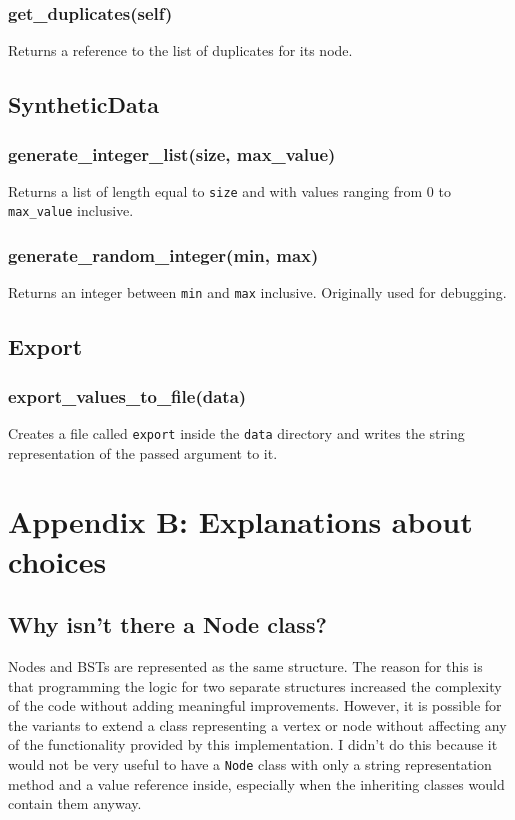 \documentclass[fleqn,10pt]{SelfArx} %
\begin{document}
\subsubsection*{get\_duplicates(self)}
Returns a reference to the list of duplicates for its node.

\subsection*{SyntheticData}
\subsubsection*{generate\_integer\_list(size, max\_value)}
Returns a list of length equal to \texttt{size} and with values ranging from 0 to \texttt{max\_value} inclusive.
\subsubsection*{generate\_random\_integer(min, max)}
Returns an integer between \texttt{min} and \texttt{max} inclusive. Originally used for debugging.

\subsection*{Export}
\subsubsection*{export\_values\_to\_file(data)}
Creates a file called \texttt{export} inside the \texttt{data} directory and writes the string representation of the passed argument to it.


\section{Appendix B: Explanations about choices}
\subsection*{Why isn't there a Node class?}
	Nodes and BSTs are represented as the same structure. The reason for this is that programming the logic for two separate structures increased the complexity of the code without adding meaningful improvements. However, it is possible for the variants to extend a class representing a vertex or node without affecting any of the functionality provided by this implementation. I didn't do this because it would not be very useful to have a \texttt{Node} class with only a string representation method and a value reference inside, especially when the inheriting classes would contain them anyway.
\end{document}
